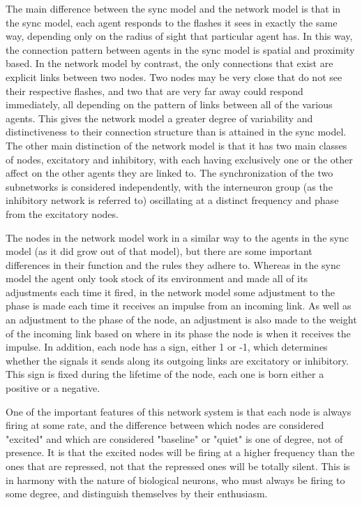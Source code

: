 \documentclass[12pt]{article}
\begin{document}
The main difference between the sync model and the network model is that in the sync model, each agent responds to the flashes it sees in exactly the same way, depending only on the radius of sight that particular agent has.  In this way, the connection pattern between agents in the sync model is spatial and proximity based.  In the network model by contrast, the only connections that exist are explicit links between two nodes.  Two nodes may be very close that do not see their respective flashes, and two that are very far away could respond immediately, all depending on the pattern of links between all of the various agents.  This gives the network model a greater degree of variability and distinctiveness to their connection structure than is attained in the sync model.  The other main distinction of the network model is that it has two main classes of nodes, excitatory and inhibitory, with each having exclusively one or the other affect on the other agents they are linked to.  The synchronization of the two subnetworks is considered independently, with the interneuron group (as the inhibitory network is referred to) oscillating at a distinct frequency and phase from the excitatory nodes.

The nodes in the network model work in a similar way to the agents in the sync model (as it did grow out of that model), but there are some important differences in their function and the rules they adhere to.  Whereas in the sync model the agent only took stock of its environment and made all of its adjustments each time it fired, in the network model some adjustment to the phase is made each time it receives an impulse from an incoming link.  As well as an adjustment to the phase of the node, an adjustment is also made to the weight of the incoming link based on where in its phase the node is when it receives the impulse.  In addition, each node has a sign, either 1 or -1, which determines whether the signals it sends along its outgoing links are excitatory or inhibitory.  This sign is fixed during the lifetime of the node, each one is born either a positive or a negative.  

One of the important features of this network system is that each node is always firing at some rate, and the difference between which nodes are considered "excited" and which are considered "baseline" or "quiet" is one of degree, not of presence.  It is that the excited nodes will be firing at a higher frequency than the ones that are repressed, not that the repressed ones will be totally silent.  This is in harmony with the nature of biological neurons, who must always be firing to some degree, and distinguish themselves by their enthusiasm. 
\end{document}

